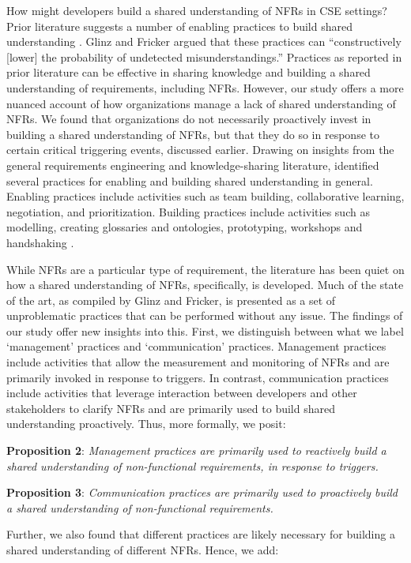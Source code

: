\documentclass[smallextended]{svjour3}        %
\newcommand\cwproposition[2]{
\normalsize 
\vspace{0.5em}%
\noindent \textbf{\sffamily\fontsize{9}{11}\selectfont Proposition #1}: \textit{#2} %
\vspace{0.5em} %
}
\begin{document}
How might developers \textmd{build} a shared understanding of NFRs in CSE settings? 
Prior literature suggests a number of enabling practices to build shared understanding \citep{glinz_shared_2015}. Glinz and Fricker argued that these practices can \textmd{``constructively [lower] the probability of undetected misunderstandings.''} Practices as reported in prior literature can be effective in sharing knowledge and building a shared understanding of requirements, including NFRs. However, our study offers a more nuanced account of how organizations manage a lack of shared understanding of NFRs. We found that organizations do not necessarily proactively invest in building a shared understanding of NFRs, but that they do so in response to certain critical triggering events, discussed earlier. 
Drawing on insights from the general requirements engineering and knowledge-sharing literature, \citet{glinz_shared_2015} identified several practices for enabling and building shared understanding in general. Enabling practices include activities such as team building, collaborative learning, negotiation, and prioritization. Building practices include activities such as modelling, creating glossaries and ontologies, prototyping, workshops and handshaking \citep{glinz_shared_2015}. 

While NFRs are a particular type of requirement, the literature has been quiet on how a shared understanding of NFRs, specifically, is developed. Much of the state of the art, as compiled by Glinz and Fricker, is presented as a set of unproblematic practices that can be performed without any issue. The findings of our study offer new insights into this. 
First, we distinguish between what we label \textmd{`management'} practices and \textmd{`communication'} practices. Management practices include activities that allow the measurement and monitoring of NFRs and are primarily invoked in response to triggers. In contrast, communication practices include activities that leverage interaction between developers and other stakeholders to clarify NFRs and are primarily used to build shared understanding proactively. Thus, more formally, we posit:

\cwproposition{2}{Management practices are primarily used to reactively build a shared understanding of non-functional requirements, in response to triggers.}


\cwproposition{3}{Communication practices are primarily used to proactively build a shared understanding of non-functional requirements.}
%
Further, we also found that different practices are likely necessary for building a shared understanding of different NFRs. Hence, we add:
\end{document}
